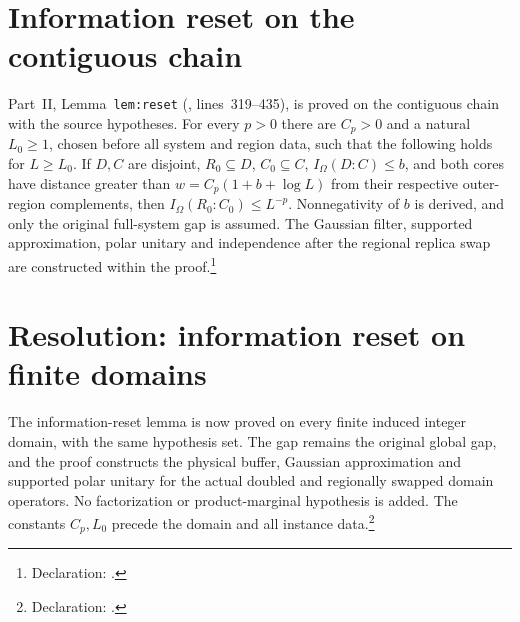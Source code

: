 \documentclass{article}
\begin{document}
\section{Information reset on the contiguous chain}

Part~II, Lemma~\texttt{lem:reset}
(, lines~319--435), is proved on the
contiguous chain with the source hypotheses. For every $p>0$ there are
$C_p>0$ and a natural $L_0\ge1$, chosen before all system and region data,
such that the following holds for $L\ge L_0$. If $D,C$ are disjoint,
$R_0\subseteq D$, $C_0\subseteq C$, $I_\Omega(D:C)\le b$, and both
cores have distance greater than $w=C_p(1+b+\log L)$ from their respective
outer-region complements, then $I_\Omega(R_0:C_0)\le L^{-p}$.
Nonnegativity of $b$ is derived, and only the original full-system gap is
assumed. The Gaussian filter, supported approximation, polar unitary and
independence after the regional replica swap are constructed within the
proof.\footnote{Declaration:
    .}

\section{Resolution: information reset on finite domains}

The information-reset lemma is now proved on every finite induced integer
 domain, with the same hypothesis set. The gap remains the original global
 gap, and the proof constructs the physical buffer, Gaussian approximation
 and supported polar unitary for the actual doubled and regionally swapped
 domain operators. No factorization or product-marginal hypothesis is added.
 The constants $C_p,L_0$ precede the domain and all instance data.\footnote{
 Declaration: .}
\end{document}
